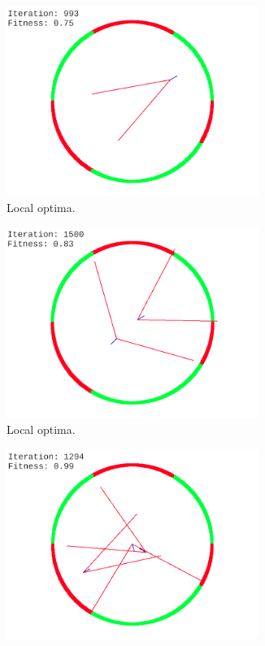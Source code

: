 \begin{figure}
    \centering
    \begin{subfigure}{0.3\textwidth}
        \centering
        \includegraphics[width=0.9\textwidth]{Pictures/bna-localopt-75}
       \caption{Local optima.}
    \end{subfigure}\hfill
    \begin{subfigure}{0.3\textwidth}
        \centering
        \includegraphics[width=0.9\textwidth]{Pictures/bna-localopt-83}
        \caption{Local optima.}
    \end{subfigure}\hfill
    \begin{subfigure}{0.3\textwidth}
        \centering
        \includegraphics[width=0.9\textwidth]{Pictures/bna-localopt-1}

\end{subfigure}
\end{figure}
